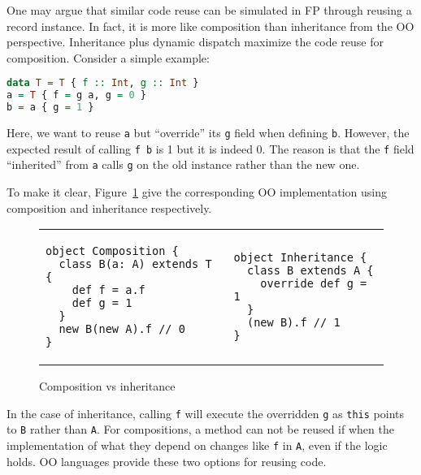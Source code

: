 One may argue that similar code reuse can be simulated in FP through reusing a record instance.
In fact, it is more like composition than inheritance from the OO perspective.
Inheritance plus dynamic dispatch maximize the code reuse for composition.
Consider a simple example:

\begin{lstlisting}[language=haskell]
data T = T { f :: Int, g :: Int }
a = T { f = g a, g = 0 }
b = a { g = 1 }
\end{lstlisting}
Here, we want to reuse \lstinline{a} but ``override'' its \lstinline{g} field when defining \lstinline{b}.
However, the expected result of calling \lstinline{f b} is 1 but it is indeed 0.
The reason is that the \lstinline{f} field ``inherited'' from \lstinline{a} calls
\lstinline{g} on the old instance rather than the new one.

To make it clear, Figure~\ref{code:compare} give the corresponding OO implementation using composition
and inheritance respectively.
\begin{figure}
\begin{tabular}{ll}
\begin{minipage}{.25\textwidth}
\begin{comment}
\begin{lstlisting}
trait T {
  def f: Int
  def g: Int
}
class A extends T {
  def f = g
  def g = 0
}
\end{lstlisting}
\end{comment}
\begin{lstlisting}
object Composition {
  class B(a: A) extends T {
    def f = a.f
    def g = 1
  }
  new B(new A).f // 0
}
\end{lstlisting}
\end{minipage}
&
\begin{minipage}{.25\textwidth}
\begin{lstlisting}
object Inheritance {
  class B extends A {
    override def g = 1
  }
  (new B).f // 1
}
\end{lstlisting}
\end{minipage}
\end{tabular}
\caption{Composition vs inheritance}
\label{code:compare}
\end{figure}
In the case of inheritance, calling \lstinline{f} will execute the overridden \lstinline{g}
as \lstinline{this} points to \lstinline{B} rather than \lstinline{A}.
For compositions, a method can not be reused if when the implementation of what
they depend on changes like \lstinline{f} in \lstinline{A}, even if the logic holds.
OO languages provide these two options for reusing code.

